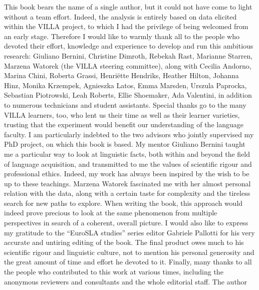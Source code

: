 
This book bears the name of a single author, but it could not have come to light without a team effort. Indeed, the analysis is entirely based on data elicited within the VILLA project, to which I had the privilege of being welcomed from an early stage. Therefore I would like to warmly thank all to the people who devoted their effort, knowledge and experience to develop and run this ambitious research: Giuliano Bernini, Christine Dimroth, Rebekah Rast, Marianne Starren, Marzena Watorek (the VILLA steering committee), along with Cecilia Andorno, Marina Chini, Roberta Grassi, Henriëtte Hendriks, Heather Hilton, Johanna Hinz, Monika Krzempek, Agnieszka Latos, Emma Marsden, Urszula Paprocka, Sebastian Piotrowski, Leah Roberts, Ellie Shoemaker, Ada Valentini, in addition to numerous technicians and student assistants. Special thanks go to the many VILLA learners, too, who lent us their time as well as their learner varieties, trusting that the experiment would benefit our understanding of the language faculty.
I am particularly indebted to the two advisors who jointly supervised my PhD project, on which this book is based. My mentor Giuliano Bernini taught me a particular way to look at linguistic facts, both within and beyond the field of language acquisition, and transmitted to me the values of scientific rigour and professional ethics. Indeed, my work has always been inspired by the wish to be up to these teachings. Marzena Watorek fascinated me with her almost personal relation with the data, along with a certain taste for complexity and the tireless search for new paths to explore. When writing the book, this approach would indeed prove precious to look at the same phenomenon from multiple perspectives in search of a coherent, overall picture.
I would also like to express my gratitude to the “EuroSLA studies” series editor Gabriele Pallotti for his very accurate and untiring editing of the book. The final product owes much to his scientific rigour and linguistic culture, not to mention his personal generosity and the great amount of time and effort he devoted to it. Finally, many thanks to all the people who contributed to this work at various times, including the anonymous reviewers and consultants and the whole editorial staff.\medskip
{
\raggedleft
The author
}
